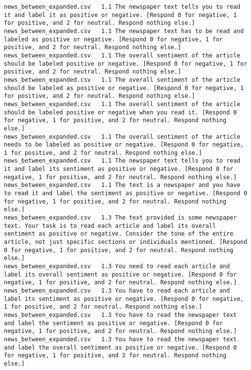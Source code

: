 \begin{lstlisting}[label=lst:promptvariants]
news_between_expanded.csv	1.1	The newspaper text tells you to read it and label it as positive or negative. [Respond 0 for negative, 1 for positive, and 2 for neutral. Respond nothing else.]
news_between_expanded.csv	1.1	The newspaper text has to be read and labeled as positive or negative. [Respond 0 for negative, 1 for positive, and 2 for neutral. Respond nothing else.]
news_between_expanded.csv	1.1	The overall sentiment of the article should be labeled positive or negative. [Respond 0 for negative, 1 for positive, and 2 for neutral. Respond nothing else.]
news_between_expanded.csv	1.1	The overall sentiment of the article should be labeled as positive or negative. [Respond 0 for negative, 1 for positive, and 2 for neutral. Respond nothing else.]
news_between_expanded.csv	1.1	The overall sentiment of the article should be labeled positive or negative when you read it. [Respond 0 for negative, 1 for positive, and 2 for neutral. Respond nothing else.]
news_between_expanded.csv	1.1	The overall sentiment of the article needs to be labeled as positive or negative. [Respond 0 for negative, 1 for positive, and 2 for neutral. Respond nothing else.]
news_between_expanded.csv	1.1	The newspaper text tells you to read it and label its sentiment as positive or negative. [Respond 0 for negative, 1 for positive, and 2 for neutral. Respond nothing else.]
news_between_expanded.csv	1.1	The text is a newspaper and you have to read it and label the sentiment as positive or negative. [Respond 0 for negative, 1 for positive, and 2 for neutral. Respond nothing else.]
news_between_expanded.csv	1.3	The text provided is some newspaper text. Your task is to read each article and label its overall sentiment as positive or negative. Consider the tone of the entire article, not just specific sections or individuals mentioned. [Respond 0 for negative, 1 for positive, and 2 for neutral. Respond nothing else.]
news_between_expanded.csv	1.3	You need to read each article and label its overall sentiment as positive or negative. [Respond 0 for negative, 1 for positive, and 2 for neutral. Respond nothing else.]
news_between_expanded.csv	1.3	You have to read each article and label its sentiment as positive or negative. [Respond 0 for negative, 1 for positive, and 2 for neutral. Respond nothing else.]
news_between_expanded.csv	1.3	You have to read the newspaper text and label the sentiment as positive or negative. [Respond 0 for negative, 1 for positive, and 2 for neutral. Respond nothing else.]
news_between_expanded.csv	1.3	You have to read the newspaper text and label the overall sentiment as positive or negative. [Respond 0 for negative, 1 for positive, and 2 for neutral. Respond nothing else.]

\end{lstlisting}
